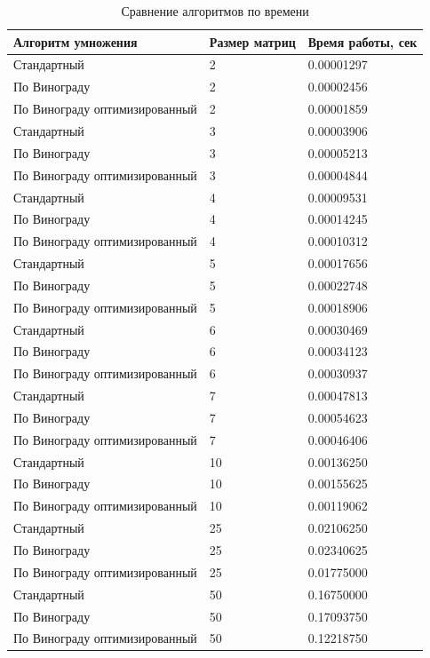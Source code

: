 \documentclass[12pt]{report}
\begin{document}
\begin{table}[H]
	\caption{\label{tab:canonsummary}Сравнение алгоритмов по времени}
	\begin{center}
\begin{tabular}{ | l | l | l | }
	\hline
	Алгоритм умножения & Размер матриц & Время работы, сек \\ \hline
	Стандартный & 2 & 0.00001297 \\
	По Винограду & 2 & 0.00002456 \\
	По Винограду оптимизированный & 2 & 0.00001859 \\ \hline
	Стандартный & 3 & 0.00003906 \\
	По Винограду & 3 & 0.00005213 \\
	По Винограду оптимизированный & 3 & 0.00004844 \\ \hline
	Стандартный & 4 & 0.00009531 \\
	По Винограду & 4 & 0.00014245 \\
	По Винограду оптимизированный & 4 & 0.00010312 \\ \hline
	Стандартный & 5 & 0.00017656 \\
	По Винограду & 5 & 0.00022748 \\
	По Винограду оптимизированный & 5 & 0.00018906 \\ \hline
	Стандартный & 6 & 0.00030469 \\
	По Винограду & 6 & 0.00034123 \\
	По Винограду оптимизированный & 6 & 0.00030937 \\ \hline
	Стандартный & 7 & 0.00047813 \\
	По Винограду & 7 & 0.00054623 \\
	По Винограду оптимизированный & 7 & 0.00046406 \\ \hline
	Стандартный & 10 & 0.00136250 \\
	По Винограду & 10 & 0.00155625 \\
	По Винограду оптимизированный & 10 & 0.00119062 \\ \hline
	Стандартный & 25 & 0.02106250 \\
	По Винограду & 25 & 0.02340625 \\
	По Винограду оптимизированный & 25 & 0.01775000 \\ \hline
	Стандартный & 50 & 0.16750000 \\
	По Винограду & 50 & 0.17093750 \\
	По Винограду оптимизированный & 50 & 0.12218750 \\
	\hline
\end{tabular}
\end{center}
\end{table} 
\end{document}
